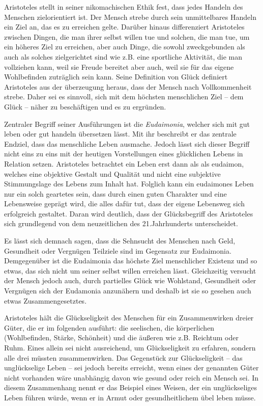 Aristoteles stellt in seiner nikomachischen Ethik fest, dass jedes Handeln des Menschen zielorientiert ist. 
Der Mensch strebe durch sein unmittelbares Handeln ein Ziel an, das es zu erreichen gelte\cite{MF93, S.4}.
Darüber hinaus differenziert Aristoteles zwischen Dingen, die man ihrer selbst willen tue und solchen, die man tue, um ein höheres Ziel zu erreichen, aber auch Dinge, die sowohl zweckgebunden als auch als solches zielgerichtet sind wie z.B. eine sportliche Aktivität, die man vollziehen kann, weil sie Freude bereitet aber auch, weil sie für das eigene Wohlbefinden zuträglich sein kann. 
Seine Definition von Glück definiert Aristoteles aus der überzeugung heraus, dass der Mensch nach Vollkommenheit strebe. 
Daher sei es sinnvoll, sich mit dem höchsten menschlichen Ziel -- dem Glück -- näher zu beschäftigen und es zu ergründen. 

Zentraler Begriff seiner Ausführungen ist die \textit{Eudaimonia}, welcher sich mit \glqq gut leben\grqq{} oder \glqq gut handeln\grqq{} übersetzen lässt\cite{MF93, S.5}.
Mit ihr beschreibt er das zentrale Endziel, dass das menschliche Leben ausmache. 
Jedoch lässt sich dieser Begriff nicht eins zu eins mit der heutigen Vorstellungen eines glücklichen Lebens in Relation setzen.
Aristoteles betrachtet ein Leben erst dann als als eudaimon, welches eine \glqq objektive Gestalt und Qualität und nicht eine subjektive Stimmungslage des Lebens zum Inhalt hat.\grqq{}\cite{MF93, S.5}
 Folglich kann ein eudaimones Leben nur ein solch geartetes sein, dass durch einen guten Charakter und eine Lebensweise geprägt wird, die alles dafür tut, dass der eigene Lebensweg sich erfolgreich gestaltet. 
 Daran wird deutlich, dass der Glücksbegriff des Aristoteles sich grundlegend von dem neuzeitlichen des 21.Jahrhunderts unterscheidet.
 
Es lässt sich demnach sagen, dass die Sehnsucht des Menschen nach Geld, Gesundheit oder Vergnügen Teilziele sind im Gegensatz zur Eudaimonia. 
Demgegenüber ist die Eudaimonia das höchste Ziel menschlicher Existenz und so etwas, das sich nicht um seiner selbst willen erreichen lässt. 
Gleichzeitig versucht der Mensch jedoch auch, durch partielles Glück wie Wohlstand, Gesundheit oder Vergnügen sich der Eudamonia anzunähern und deshalb ist sie so gesehen auch etwas Zusammengesetztes. 

Aristoteles hält die Glückseligkeit des Menschen für ein Zusammenwirken dreier Güter, die er im folgenden ausführt: die seelischen, die körperlichen (Wohlbefinden, Stärke, Schönheit) und die äußeren wie z.B. Reichtum oder Ruhm\cite{DL67, S.257f}.
Eines allein sei nicht ausreichend, um Glückseligkeit zu erfahren, sondern alle drei müssten zusammenwirken. 
Das Gegenstück zur Glückseligkeit -- das unglückselige Leben -- sei jedoch bereits erreicht, wenn eines der genannten Güter nicht vorhanden wäre unabhängig davon wie gesund oder reich ein Mensch sei. 
In diesem Zusammenhang nennt er das Beispiel eines Weisen, der ein unglückseliges Leben führen würde, wenn er in Armut oder gesundheitlichem übel leben müsse.

